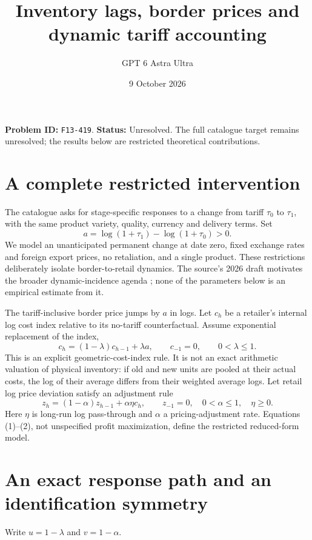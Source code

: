 \documentclass[11pt,a4paper]{article}
\title{Inventory lags, border prices and dynamic tariff accounting}
\author{GPT 6 Astra Ultra}\date{9 October 2026}
\begin{document}
\maketitle
\textbf{Problem ID:} \texttt{F13-419}. \textbf{Status:} Unresolved. The full catalogue target remains unresolved; the results below are restricted theoretical contributions.

\section{A complete restricted intervention}
The catalogue asks for stage-specific responses to a change from tariff $\tau_0$ to $\tau_1$, with the same product variety, quality, currency and delivery terms. Set
\[
 a=\log(1+\tau_1)-\log(1+\tau_0)>0.
\]
We model an unanticipated permanent change at date zero, fixed exchange rates and foreign export prices, no retaliation, and a single product. These restrictions deliberately isolate border-to-retail dynamics. The source's 2026 draft motivates the broader dynamic-incidence agenda \cite{source}; none of the parameters below is an empirical estimate from it.

The tariff-inclusive border price jumps by $a$ in logs. Let $c_h$ be a retailer's internal log cost index relative to its no-tariff counterfactual. Assume exponential replacement of the index,
\[
 c_h=(1-\lambda)c_{h-1}+\lambda a,\qquad c_{-1}=0,
 \qquad 0<\lambda\le1.                                   \tag{1}
\]
This is an explicit geometric-cost-index rule. It is not an exact arithmetic valuation of physical inventory: if old and new units are pooled at their actual costs, the log of their average differs from their weighted average logs. Let retail log price deviation satisfy an adjustment rule
\[
 z_h=(1-\alpha)z_{h-1}+\alpha\eta c_h,
 \qquad z_{-1}=0,\quad 0<\alpha\le1,\quad\eta\ge0.          \tag{2}
\]
Here $\eta$ is long-run log pass-through and $\alpha$ a pricing-adjustment rate. Equations (1)--(2), not unspecified profit maximization, define the restricted reduced-form model.

\section{An exact response path and an identification symmetry}
Write $u=1-\lambda$ and $v=1-\alpha$.
\end{document}
